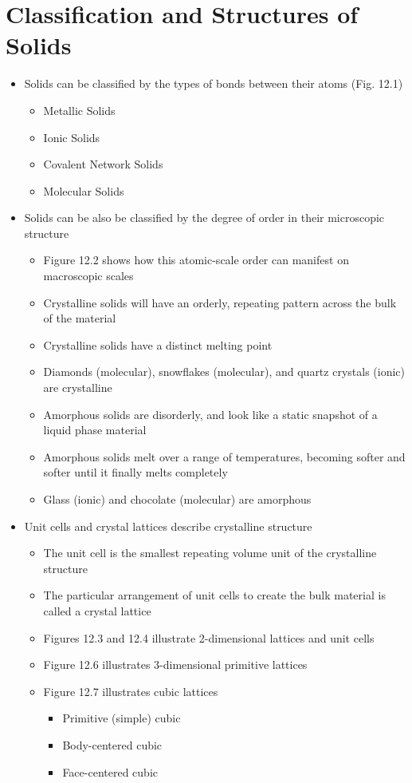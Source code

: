 \documentclass[12pt, openany, letterpaper]{memoir}
\begin{document}
\section{Classification and Structures of Solids}
\begin{itemize}
  \item Solids can be classified by the types of bonds between their atoms (Fig. 12.1)
  \begin{itemize}
    \item Metallic Solids
    \item Ionic Solids
    \item Covalent Network Solids
    \item Molecular Solids
  \end{itemize}
	\item Solids can be also be classified by the degree of order in their microscopic structure
	\begin{itemize}
    \item Figure 12.2 shows how this atomic-scale order can manifest on macroscopic scales
		\item Crystalline solids will have an orderly, repeating pattern across the bulk of the material
		\item Crystalline solids have a distinct melting point
		\item Diamonds (molecular), snowflakes (molecular), and quartz crystals (ionic) are crystalline 
		\item Amorphous solids are disorderly, and look like a static snapshot of a liquid phase material
		\item Amorphous solids melt over a range of temperatures, becoming softer and softer until it finally melts completely
		\item Glass (ionic) and chocolate (molecular) are amorphous
	\end{itemize}
  \item Unit cells and crystal lattices describe crystalline structure
  \begin{itemize}
    \item The unit cell is the smallest repeating volume unit of the crystalline structure
    \item The particular arrangement of unit cells to create the bulk material is called a crystal lattice 
    \item Figures 12.3 and 12.4 illustrate 2-dimensional lattices and unit cells
    \item Figure 12.6 illustrates 3-dimensional primitive lattices
    \item Figure 12.7 illustrates cubic lattices
    \begin{itemize}
      \item Primitive (simple) cubic
      \item Body-centered cubic
      \item Face-centered cubic
    \end{itemize}
  \end{itemize}
\end{itemize}
	
\end{document}
